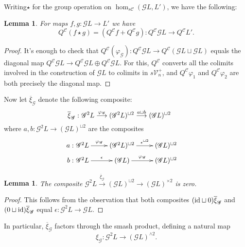 \documentclass[11pt]{amsart}
\theoremstyle{plain}
\newtheorem{lem}[thm]{Lemma}
\theoremstyle{definition}
\let\phi\varphi
\renewcommand{\to}{\longrightarrow}
\newcommand{\scrG}{\mathscr{G}}
\newcommand{\calC}{\mathcal{C}}
\newcommand{\calV}{\mathcal{V}}
\theoremstyle{plain}
\newcommand{\vect}[2]{\calV^{#1}_{#2}}
\newcommand{\BSW}{{\scrG}}
\newcommand{\Id}{\textup{id}}
\begin{document}
\begin{Composite functor spectral sequences}
Writing$\star$ for the group operation on $\hom_{s\calC}(\BSW L,L')$, we have the following:
\begin{lem}
For maps $f,g:\BSW L\to L'$ we have 
\[Q^{\calC}(f\star g)=(Q^{\calC}f+Q^{\calC}g):Q^{\calC}\BSW L\to Q^{\calC}L'.\]
\end{lem}
\begin{proof}
It's enough to check that $Q^{\calC}(\phi_\BSW ):Q^{\calC}\BSW L\to Q^{\calC}(\BSW L\sqcup \BSW L)$ equals the diagonal map $Q^{\calC}\BSW L\to Q^{\calC}\BSW L\oplus Q^{\calC}\BSW L$. For this, $Q^{\calC}$ converts all the colimits involved in the construction of $\BSW L$ to colimits in $s\vect{+}{n}$, and $Q^{\calC}\phi_1$ and $Q^{\calC}\phi_2$ are both precisely the diagonal map.
\end{proof}

Now let $\overline{\xi}_{\BSW }$ denote the following composite:
\[\makebox[0mm][r]{$\overline{\xi}_{\BSW }:\ $}\BSW^2L\overset{\phi_{\BSW }}{\to}(\BSW^2L)^{\sqcup2}\overset{a\sqcup b}{\to}(\BSW L)^{\sqcup2}\]
where $a,b:\BSW^2L\to(\BSW L)^{\sqcup2}$ are the composites
\[\xymatrix@R=2mm{
\makebox[0mm][r]{$a:\ $}\BSW^2L\ar[r]^-{\phi_{\BSW }}
&%
(\BSW^2L)^{\sqcup2}\ar[r]^-{\epsilon^{\sqcup2}}
&%
(\BSW L)^{\sqcup2}\\
\makebox[0mm][r]{$b:\ $}\BSW^2L\ar[r]^-{\epsilon}
&%
(\BSW L)\ar[r]^-{\phi_{\BSW }}
&%
(\BSW L)^{\sqcup2}
}\]
\begin{lem}
The composite 
$\BSW^2L\overset{\overline{\xi}_{\BSW }}{\to}(\BSW L)^{\sqcup2}\to(\BSW L)^{\times2}$ is zero.
\end{lem}
\begin{proof}
This follows from the observation that both composites $(\Id\sqcup0)\overline{\xi}_{\BSW }$ and $(0\sqcup\Id)\overline{\xi}_{\BSW }$ equal $\epsilon:\BSW^2L\to \BSW L$.
\end{proof}
In particular, $\overline{\xi}_{\BSW }$ factors through the smash product, defining a natural map
\[\xi_{\BSW }:\BSW^2L\to (\BSW L)^{\wedge 2}.\]


\end{Composite functor spectral sequences}
\end{document}
